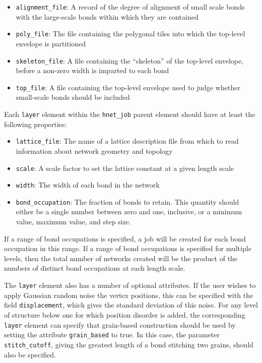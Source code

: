 \documentclass{article}
\begin{document}
\begin{itemize}
\item \texttt{alignment\_file}: A record of the degree of alignment of small scale bonds with the large-scale bonds within which they are contained
\item \texttt{poly\_file}: The file containing the polygonal tiles into which
the top-level envelope is partitioned
\item \texttt{skeleton\_file}: A file containing the ``skeleton'' of the 
top-level envelope, before a non-zero width is imparted to each bond
\item \texttt{top\_file}: A file containing the top-level envelope used to
judge whether small-scale bonds should be included
\end{itemize}

Each \texttt{layer} element within the \texttt{hnet\_job} parent element
should have at least the following properties:

\begin{itemize}
\item \texttt{lattice\_file}: The name of a lattice description file from which
to read information about network geometry and topology
\item \texttt{scale}: A scale factor to set the lattice constant at a given
length scale
\item \texttt{width}: The width of each bond in the network
\item \texttt{bond\_occupation}: The fraction of bonds to retain. This
quantity should either be a single number between zero and one, inclusive, or
a minimum value, maximum value, and step size.
\end{itemize}
If a range of bond occupations is specified, a job will be created for each
bond occupation in this range. If a range of bond occupations is specified
for multiple levels, then the total number of networks created will be the
product of the numbers of distinct bond occupations at each length scale.

The \texttt{layer} element also has a number of optional attributes. If the
user wishes to apply Gaussian random noise the vertex positions, this can
be specified with the field \texttt{displacement}, which gives the standard
deviation of this noise. For any level of structure below one for which
position disorder is added, the corresponding \texttt{layer} element can
specify that grain-based construction should be used by setting the
attribute \texttt{grain\_based} to true. In this case, the parameter
\texttt{stitch\_cutoff}, giving the greatest length of a bond stitching two
grains, should also be specified.
\end{document}
